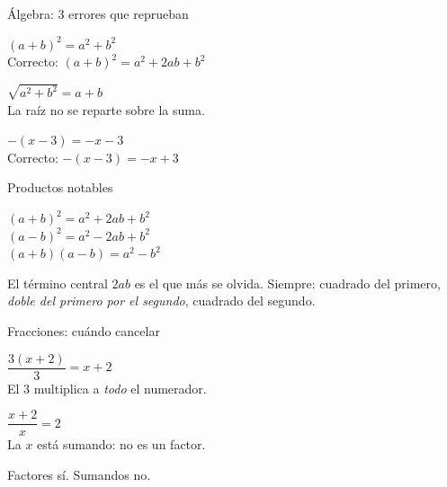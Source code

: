 \documentclass[12pt]{article}
\begin{document}

\begin{mwcarlamina}{Álgebra: 3 errores que reprueban}
\begin{cajaerror}
  \centering
  $(a+b)^2 = a^2 + b^2$ \quad\mal\\[2pt]
  {\small Correcto: } $(a+b)^2 = a^2 + 2ab + b^2$ \quad\bien
\end{cajaerror}
\begin{cajaerror}
  \centering
  $\sqrt{a^2+b^2} = a + b$ \quad\mal\\[2pt]
  {\small La raíz no se reparte sobre la suma.}
\end{cajaerror}
\begin{cajaerror}
  \centering
  $-(x-3) = -x - 3$ \quad\mal\\[2pt]
  {\small Correcto: } $-(x-3) = -x + 3$ \quad\bien
\end{cajaerror}
\end{mwcarlamina}

\begin{mwcarlamina}{Productos notables}
\begin{cajateoria}
  \centering
  $(a+b)^2 = a^2 + 2ab + b^2$\\[4pt]
  $(a-b)^2 = a^2 - 2ab + b^2$\\[4pt]
  $(a+b)(a-b) = a^2 - b^2$
\end{cajateoria}
\begin{cajapasos}
  \small El término central $2ab$ es el que más se olvida.
  Siempre: cuadrado del primero, \emph{doble del primero por el
  segundo}, cuadrado del segundo.
\end{cajapasos}
\end{mwcarlamina}

\begin{mwcarlamina}{Fracciones: cuándo cancelar}
\begin{cajaok}
  \centering
  $\dfrac{3(x+2)}{3} = x+2$ \quad\bien\\[3pt]
  {\small El 3 multiplica a \emph{todo} el numerador.}
\end{cajaok}
\begin{cajaerror}
  \centering
  $\dfrac{x+2}{x} = 2$ \quad\mal\\[3pt]
  {\small La $x$ está sumando: no es un factor.}
\end{cajaerror}
\begin{cajateoria}
  \centering\nxheav
  Factores sí. Sumandos no.
\end{cajateoria}
\end{mwcarlamina}
\end{document}
